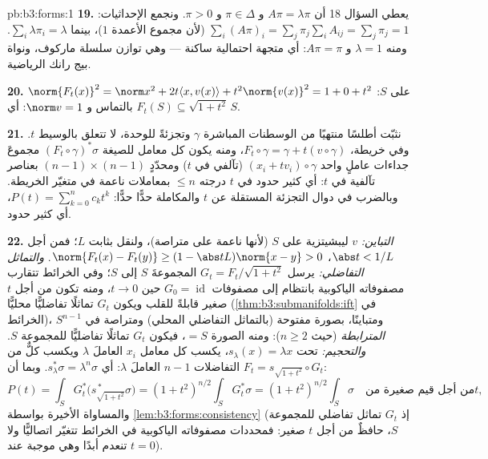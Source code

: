 \begin{solution}{pb:b3:forms:1}
\textbf{19.} يعطي السؤال 18 أن $A\pi = \lambda\pi$ و $\pi \in
\Delta$ و $\pi > 0$.
ونجمع الإحداثيات: $\sum_i(A\pi)_i =
\sum_j\pi_j\sum_iA_{ij} = \sum_j\pi_j = 1$ (لأن مجموع الأعمدة $1$)، بينما
$\sum_i\lambda\pi_i = \lambda$. ومنه $\lambda = 1$ و $A\pi = \pi$: أي متجهة احتمالية
ساكنة --- وهي توازن سلسلة ماركوف، ونواة بيج رانك الرياضية.

\textbf{20.} على $S$: $\norm{F_t(x)}^2 = \norm x^2 +
2t\langle x, v(x)\rangle + t^2\norm{v(x)}^2 = 1 + 0 + t^2$ بالتماس و $\norm v = 1$: أي
$F_t(S) \subseteq
\sqrt{1+t^2}\,S$.

\textbf{21.} نثبّت أطلسًا منتهيًا من الوسطنات المباشرة $\gamma$
وتجزئةً للوحدة، لا تتعلق بالوسيط $t$. وفي خريطة، $F_t\circ\gamma = \gamma + t(v\circ\gamma)$، ومنه يكون
كل معامل للصيغة $(F_t\circ\gamma)^*\sigma$ مجموعَ جداءات عاملٍ واحد $(x_i + tv_i)\circ\gamma$ (تآلفي
في $t$) ومحدّدٍ $(n-1)\times(n-1)$ بعناصر تآلفية في $t$: أي كثير حدود في
$t$ درجته $\leq n$ بمعاملات ناعمة في متغيّر الخريطة. وبالضرب
في دوال التجزئة المستقلة عن $t$ والمكاملة حدًّا حدًّا: $P(t) = \sum_{k=0}^n c_kt^k$،
أي كثير حدود.

\textbf{22.} \emph{التباين:} $v$ ليبشيتزية على $S$ (لأنها ناعمة
على متراصة)، ولنقل بثابت $L$؛ فمن أجل $\abs t <
1/L$، $\norm{F_t(x) - F_t(y)} \geq (1 - \abs
tL)\norm{x - y} > 0$.
\emph{والتماثل التفاضلي:} يرسل $G_t =
F_t/\sqrt{1 + t^2}$ المجموعةَ $S$ إلى $S$؛
وفي الخرائط تتقارب مصفوفاته الياكوبية بانتظام إلى مصفوفات
$G_0 = \operatorname{id}$ حين $t \to 0$، ومنه تكون من أجل $t$ صغير قابلةً للقلب
ويكون $G_t$ تماثلًا تفاضليًّا محليًّا (\cref{thm:b3:submanifolds:ift} في الخرائط)،
ومتباينًا، بصورة مفتوحة (بالتماثل التفاضلي المحلي) ومتراصة في
$S^{n-1}$ \emph{المترابطة} (حيث $n \geq 2$): ومنه الصورة
$= S$، فيكون $G_t$ تماثلًا تفاضليًّا للمجموعة $S$.
\emph{والتحجيم:} تحت $s_\lambda(x) = \lambda x$، يكسب كل معامل $x_i$ العاملَ
$\lambda$ ويكسب كلٌّ من التفاضلات $n - 1$ العاملَ $\lambda$:
أي $s_\lambda^*\sigma =
\lambda^n\sigma$. وبما أن $F_t = s_{\sqrt{1+t^2}}\circ G_t$:
\[
P(t) = \int_SG_t^*\bigl(s_{\sqrt{1+t^2}}^{\,*}\sigma\bigr)
= (1 + t^2)^{n/2}\int_SG_t^*\sigma
= (1 + t^2)^{n/2}\int_S\sigma
\quad\text{من أجل قيم صغيرة من} t,
\]
والمساواة الأخيرة بواسطة \cref{lem:b3:forms:consistency} (إذ $G_t$ تماثل تفاضلي
للمجموعة $S$، حافظٌ  من أجل $t$ صغير: فمحددات مصفوفاته
الياكوبية في الخرائط تتغيّر اتصاليًّا ولا تنعدم أبدًا وهي موجبة
عند $t = 0$).


\end{solution}
